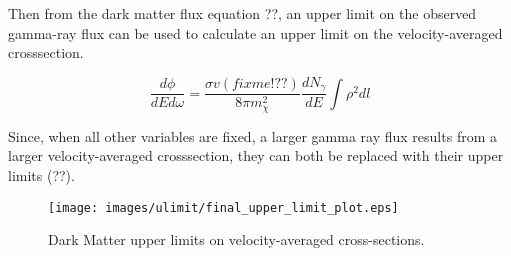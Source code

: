   Then from the dark matter flux equation ??, an upper limit on the observed gamma-ray flux can be used to calculate an upper limit on the velocity-averaged crosssection.
  
  \begin{equation}\label{eqn:ulim}
    \frac{d\phi}{dE d\omega} = \frac{ \sigma v (fixme!??)}{8\pi m_{\chi}^{2}} \frac{dN_{\gamma}}{dE} \int \rho^{2} dl
  \end{equation}
  
  Since, when all other variables are fixed, a larger gamma ray flux results from a larger velocity-averaged crosssection, they can both be replaced with their upper limits (??).


  \begin{figure}[ht]
    \begin{center}
      \texttt{[image: images/ulimit/final\_upper\_limit\_plot.eps]}
      \caption[Dark Matter Upper Limit Plot]{Dark Matter upper limits on velocity-averaged cross-sections.}\label{fig:ulim}
    \end{center}
  \end{figure}
  

